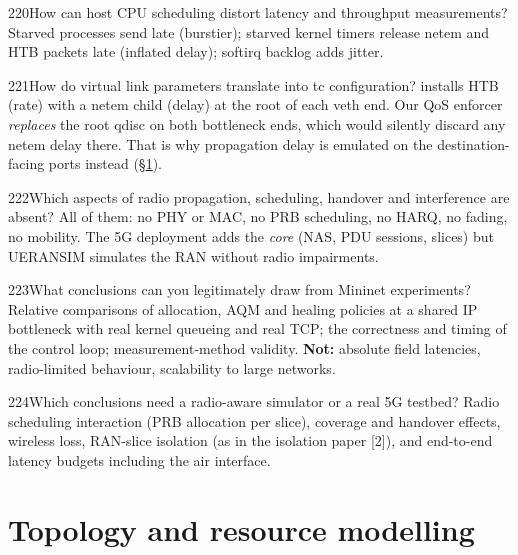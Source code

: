 \begin{qa}{220}{How can host CPU scheduling distort latency and throughput measurements?}
Starved processes send late (burstier); starved kernel timers release netem and HTB packets late (inflated delay);
softirq backlog adds jitter.
\end{qa}

\begin{qa}{221}{How do virtual link parameters translate into tc configuration?}
 installs HTB (rate) with a netem child (delay) at the root of each veth end. Our QoS enforcer
\emph{replaces} the root qdisc on both bottleneck ends, which would silently discard any netem delay there. That is
why propagation delay is emulated on the destination-facing ports instead (§\ref{sec:delayplace}).
\end{qa}

\begin{qa}{222}{Which aspects of radio propagation, scheduling, handover and interference are absent?}
All of them: no PHY or MAC, no PRB scheduling, no HARQ, no fading, no mobility. The 5G deployment adds the
\emph{core} (NAS, PDU sessions, slices) but UERANSIM simulates the RAN without radio impairments.
\end{qa}

\begin{qa}{223}{What conclusions can you legitimately draw from Mininet experiments?}
Relative comparisons of allocation, AQM and healing policies at a shared IP bottleneck with real kernel queueing and
real TCP; the correctness and timing of the control loop; measurement-method validity.
\textbf{Not:} absolute field latencies, radio-limited behaviour, scalability to large networks.
\end{qa}

\begin{qa}{224}{Which conclusions need a radio-aware simulator or a real 5G testbed?}
Radio scheduling interaction (PRB allocation per slice), coverage and handover effects, wireless loss, RAN-slice
isolation (as in the isolation paper [2]), and end-to-end latency budgets including the air interface.
\end{qa}

\section{Topology and resource modelling}
\label{sec:delayplace}

